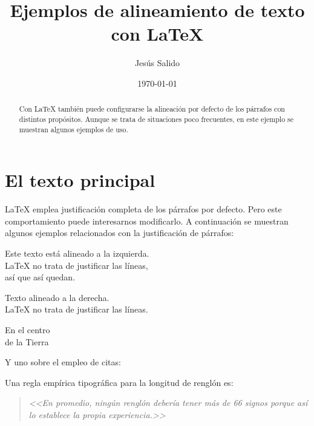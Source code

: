 \documentclass[11pt,a4paper,draft]{article}
\title{Ejemplos de alineamiento de texto con \LaTeX}
\author{Jesús Salido}
\date{\today}
\begin{document}
\maketitle

\begin{abstract}
	Con \LaTeX{} también puede configurarse la alineación por defecto de los párrafos con distintos propósitos. Aunque se trata de situaciones poco frecuentes, en este ejemplo se muestran algunos ejemplos de uso.
\end{abstract}

\listoftodos[Pendiente]

\section{El texto principal}

\LaTeX{} emplea justificación completa de los párrafos por defecto. Pero este comportamiento puede interesarnos modificarlo. A continuación se muestran algunos ejemplos relacionados con la justificación de párrafos:

\begin{flushleft}
	Este texto está alineado a la izquierda. \\
	\LaTeX{} no trata de justificar las líneas, \\
	así que así quedan.
\end{flushleft}

\begin{flushright}
	Texto alineado a la derecha. \\
	\LaTeX{} no trata de justificar las líneas.
\end{flushright}

\begin{center}
	En el centro\\
	de la Tierra
\end{center}


\noindent Y uno sobre el empleo de citas:

Una regla empírica tipográfica para la longitud de renglón es: 
\begin{quote}
\emph{	<<En promedio, ningún renglón debería tener más de 66 signos porque así lo establece la propia experiencia.>>}
\end{quote}
\end{document}
